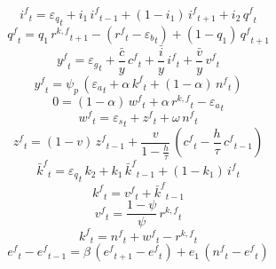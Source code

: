 \begin{dmath}
{{i^{f}}}_{t}={{\varepsilon_q}}_{t}+{{i_1}}\, {{i^{f}}}_{t-1}+\left(1-{{i_1}}\right)\, {{i^{f}}}_{t+1}+{{i_2}}\, {{q^{f}}}_{t}
\end{dmath}
\begin{dmath}
{{q^{f}}}_{t}={{q_1}}\, {{r^{k,f}}}_{t+1}-\left({{r^{f}}}_{t}-{{\varepsilon_b}}_{t}\right)+\left(1-{{q_1}}\right)\, {{q^{f}}}_{t+1}
\end{dmath}
\begin{dmath}
{{y^{f}}}_{t}={{\varepsilon_g}}_{t}+{{\frac{\bar{c}}{y}}}\, {{c^{f}}}_{t}+{{\frac{\bar{i}}{y}}}\, {{i^{f}}}_{t}+{{\frac{\bar{v}}{y}}}\, {{v^{f}}}_{t}
\end{dmath}
\begin{dmath}
{{y^{f}}}_{t}={{\psi_p}}\, \left({{\varepsilon_a}}_{t}+{{\alpha}}\, {{k^{f}}}_{t}+\left(1-{{\alpha}}\right)\, {{n^{f}}}_{t}\right)
\end{dmath}
\begin{dmath}
0=\left(1-{{\alpha}}\right)\, {{w^{f}}}_{t}+{{\alpha}}\, {{r^{k,f}}}_{t}-{{\varepsilon_a}}_{t}
\end{dmath}
\begin{dmath}
{{w^{f}}}_{t}={{\varepsilon_s}}_{t}+{{z^{f}}}_{t}+{{\omega}}\, {{n^{f}}}_{t}
\end{dmath}
\begin{dmath}
{{z^{f}}}_{t}=\left(1-{{v}}\right)\, {{z^{f}}}_{t-1}+\frac{{{v}}}{1-\frac{{{h}}}{{{\tau}}}}\, \left({{c^{f}}}_{t}-\frac{{{h}}}{{{\tau}}}\, {{c^{f}}}_{t-1}\right)
\end{dmath}
\begin{dmath}
{{\bar{k}^{f}}}_{t}={{\varepsilon_q}}_{t}\, {{k_2}}+{{k_1}}\, {{\bar{k}^{f}}}_{t-1}+\left(1-{{k_1}}\right)\, {{i^{f}}}_{t}
\end{dmath}
\begin{dmath}
{{k^{f}}}_{t}={{v^{f}}}_{t}+{{\bar{k}^{f}}}_{t-1}
\end{dmath}
\begin{dmath}
{{v^{f}}}_{t}=\frac{1-{{\psi}}}{{{\psi}}}\, {{r^{k,f}}}_{t}
\end{dmath}
\begin{dmath}
{{k^{f}}}_{t}={{n^{f}}}_{t}+{{w^{f}}}_{t}-{{r^{k,f}}}_{t}
\end{dmath}
\begin{dmath}
{{e^{f}}}_{t}-{{e^{f}}}_{t-1}={{\beta}}\, \left({{e^{f}}}_{t+1}-{{e^{f}}}_{t}\right)+{{e_1}}\, \left({{n^{f}}}_{t}-{{e^{f}}}_{t}\right)
\end{dmath}
